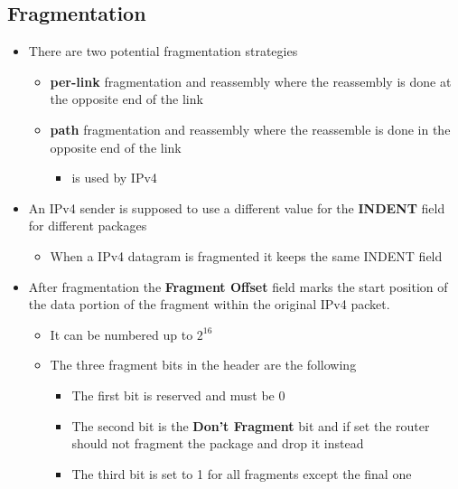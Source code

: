 \documentclass[11pt]{article}
\providecommand{\tightlist}{%
      \setlength{\itemsep}{0pt}\setlength{\parskip}{0pt}}
\begin{document}
    \subsection{Fragmentation}\label{fragmentation}

\begin{itemize}
\tightlist
\item
  There are two potential fragmentation strategies

  \begin{itemize}
  \tightlist
  \item
    \textbf{per-link} fragmentation and reassembly where the reassembly
    is done at the opposite end of the link
  \item
    \textbf{path} fragmentation and reassembly where the reassemble is
    done in the opposite end of the link

    \begin{itemize}
    \tightlist
    \item
      is used by IPv4
    \end{itemize}
  \end{itemize}
\item
  An IPv4 sender is supposed to use a different value for the
  \textbf{INDENT} field for different packages

  \begin{itemize}
  \tightlist
  \item
    When a IPv4 datagram is fragmented it keeps the same INDENT field
  \end{itemize}
\item
  After fragmentation the \textbf{Fragment Offset} field marks the start
  position of the data portion of the fragment within the original IPv4
  packet.

  \begin{itemize}
  \tightlist
  \item
    It can be numbered up to \(2^{16}\)
  \item
    The three fragment bits in the header are the following

    \begin{itemize}
    \tightlist
    \item
      The first bit is reserved and must be 0
    \item
      The second bit is the \textbf{Don't Fragment} bit and if set the
      router should not fragment the package and drop it instead
    \item
      The third bit is set to 1 for all fragments except the final one


\end{itemize}
\end{itemize}
\end{itemize}
\end{document}
